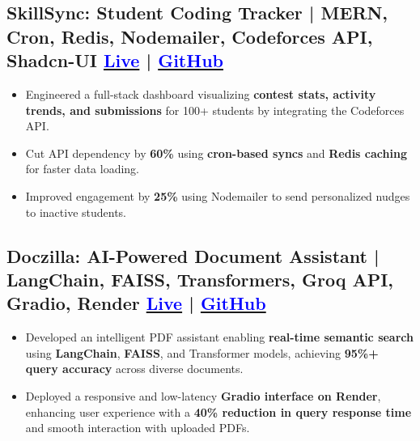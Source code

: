 \documentclass[a4paper]{article}
\begin{document}
\vspace{-1.5em}

\subsection*{
  \textbf{SkillSync: Student Coding Tracker | MERN, Cron, Redis, Nodemailer, Codeforces API, Shadcn-UI}
  \hfill 
  \textnormal{
  \href{https://student-progress-tracker-pi.vercel.app/}{\textcolor{blue}{Live}} |
  \href{https://github.com/aakash811/Student-Progress-Tracker}{\textcolor{blue}{GitHub}}
}}
\vspace{-0.5em}
\begin{itemize}[leftmargin=*]
    \item Engineered a full-stack dashboard visualizing \textbf{contest stats, activity trends, and submissions} for 100+ students by integrating the Codeforces API.
    \vspace{-0.5em}
    \item Cut API dependency by \textbf{60\%} using \textbf{cron-based syncs} and \textbf{Redis caching} for faster data loading.
    \vspace{-0.5em}
    \item Improved engagement by \textbf{25\%} using Nodemailer to send personalized nudges to inactive students.
\end{itemize}

\vspace{-1.5em}

\subsection*{
  \textbf{Doczilla: AI-Powered Document Assistant | LangChain, FAISS, Transformers, Groq API, Gradio, Render}
  \hfill 
  \textnormal{
  \href{https://pdf-chatbot-gkcz.onrender.com/}{\textcolor{blue}{Live}} |
  \href{https://github.com/aakash811/PDF-chatbot}{\textcolor{blue}{GitHub}}
}}
\vspace{-0.5em}
\begin{itemize}[leftmargin=*]
    \item Developed an intelligent PDF assistant enabling \textbf{real-time semantic search} using \textbf{LangChain}, \textbf{FAISS}, and Transformer models, achieving \textbf{95\%+ query accuracy} across diverse documents.
    \vspace{-0.5em}
    \item Deployed a responsive and low-latency \textbf{Gradio interface on Render}, enhancing user experience with a \textbf{40\% reduction in query response time} and smooth interaction with uploaded PDFs.
\end{itemize}
\end{document}
